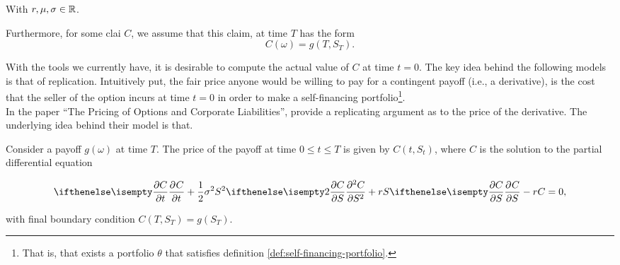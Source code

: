 \documentclass[../TGMAFFIRO.tex]{subfiles}
\begin{document}
With $r, \mu, \sigma \in \mathbb{R}$.

Furthermore, for some clai $C$, we assume that this claim, at time $T$ has the form
\begin{equation}
  C(\omega) = g(T, S_T).
\end{equation}

With the tools we currently have, it is desirable to compute the actual value of $C$ at time $t=0$. The key idea behind the following models is that of replication. Intuitively put, the fair price anyone would be willing to pay for a contingent payoff (i.e., a derivative), is the cost that the seller of the option incurs at time $t=0$ in order to make a self-financing portfolio\footnote{That is, that exists a portfolio $\theta$ that satisfies definition \ref{def:self-financing-portfolio}.}.\\

In the paper ``The Pricing of Options and Corporate Liabilities'',  provide a replicating argument as to the price of the derivative. The underlying idea behind their model is that.

\begin{theorem}
	Consider a payoff $g(\omega)$ at time $T$. The price of the payoff at time $0\leq t\leq T$ is given by $C(t,S_t)$, where $C$ is the solution to the partial differential equation
	
	\begin{equation}\label{eq:black-scholes-formula}
		\partialwrt{C}{t} + \frac{1}{2}\sigma^2S^2\partialwrt[2]{C}{S} + rS\partialwrt{C}{S} - rC = 0,
	\end{equation}

with final boundary condition $C(T,S_T) = g(S_T)$.
\end{theorem}
\end{document}
